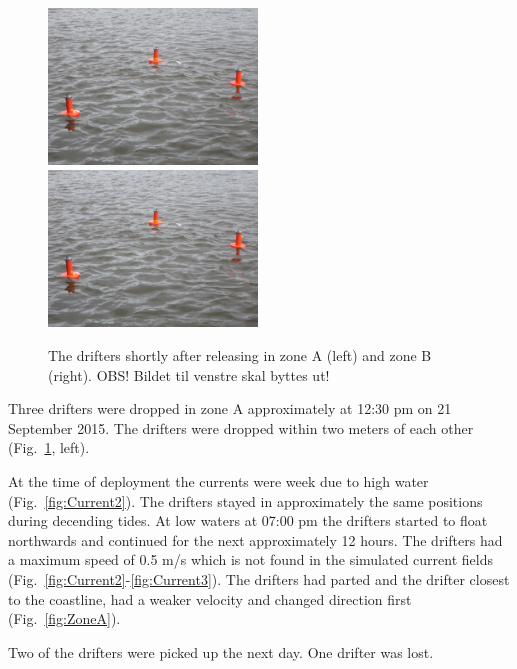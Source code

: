 \documentclass[12pt,a4paper,english]{article}
\begin{document}
%
\begin{figure}[ht]
\centerline{
\includegraphics*[width=0.495\textwidth]{Figurer/Driftere_vann}
\includegraphics*[width=0.495\textwidth]{Figurer/Driftere_vann}
}
\caption{\small
The drifters shortly after releasing in zone A (left) and zone B (right). OBS! Bildet til venstre skal byttes ut!
}
\label{fig:DriftereVann}
\end{figure}

Three drifters were dropped in zone A approximately at 12:30 pm on 21 September 2015. The drifters were dropped within two meters of each other (Fig.~\ref{fig:DriftereVann}, left).

At the time of deployment the currents were week due to high water (Fig.~\ref{fig:Current2}). The drifters stayed in approximately the same positions during decending tides. At low waters at 07:00 pm the drifters started to float northwards and continued for the next approximately 12 hours. The drifters had a maximum speed of 0.5 m/s which is not found in the simulated current fields (Fig.~\ref{fig:Current2}-\ref{fig:Current3}). The drifters had parted and the drifter closest to the coastline, had a weaker velocity and changed direction first (Fig.~\ref{fig:ZoneA}). 

Two of the drifters were picked up the next day. One drifter was lost. 

\end{document}
